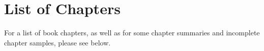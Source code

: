 \chapter*{List of Chapters}
\label{2016-pu-book-proposal-ListofChapters}

For a list of book chapters, as well as for some chapter summaries and incomplete chapter samples, please see below.







